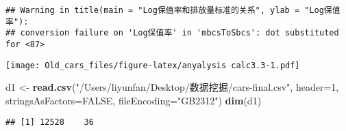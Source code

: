 \documentclass[]{article}
\newenvironment{Shaded}{\begin{snugshade}}{\end{snugshade}}
\newcommand{\KeywordTok}[1]{\textcolor[rgb]{0.13,0.29,0.53}{\textbf{#1}}}
\newcommand{\DataTypeTok}[1]{\textcolor[rgb]{0.13,0.29,0.53}{#1}}
\newcommand{\DecValTok}[1]{\textcolor[rgb]{0.00,0.00,0.81}{#1}}
\newcommand{\StringTok}[1]{\textcolor[rgb]{0.31,0.60,0.02}{#1}}
\newcommand{\OtherTok}[1]{\textcolor[rgb]{0.56,0.35,0.01}{#1}}
\newcommand{\NormalTok}[1]{#1}
\begin{document}
\begin{verbatim}
## Warning in title(main = "Log保值率和排放量标准的关系", ylab = "Log保值率"):
## conversion failure on 'Log保值率' in 'mbcsToSbcs': dot substituted for <87>
\end{verbatim}

\texttt{[image: Old\_cars\_files/figure-latex/anyalysis calc3.3-1.pdf]}

\begin{Shaded}
\begin{Highlighting}[]
\NormalTok{d1 <-}\StringTok{ }\KeywordTok{read.csv}\NormalTok{(}\StringTok{"/Users/liyunfan/Desktop/数据挖掘/cars-final.csv"}\NormalTok{, }\DataTypeTok{header=}\DecValTok{1}\NormalTok{, }\DataTypeTok{stringsAsFactors=}\OtherTok{FALSE}\NormalTok{, }\DataTypeTok{fileEncoding=}\StringTok{"GB2312"}\NormalTok{)}
\KeywordTok{dim}\NormalTok{(d1)}
\end{Highlighting}
\end{Shaded}

\begin{verbatim}
## [1] 12528    36
\end{verbatim}
\end{document}
